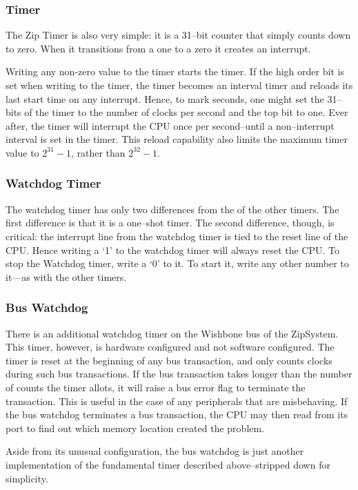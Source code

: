 \documentclass{gqtekspec}
\begin{document}
\subsubsection{Timer}

The Zip Timer is also very simple: it is a 31--bit counter that simply counts
down to zero.  When it transitions from a one to a zero it creates an interrupt.

Writing any non-zero value to the timer starts the timer.  If the high order
bit is set when writing to the timer, the timer becomes an interval timer and
reloads its last start time on any interrupt.  Hence, to mark seconds, one
might set the 31--bits of the timer to the number of clocks per second and the
top bit to one.  Ever after, the timer will interrupt the CPU once per
second--until a non--interrupt interval is set in the timer.  This reload
capability also limits the maximum timer value to $2^{31}-1$, rather than
$2^{32}-1$.

\subsubsection{Watchdog Timer}

The watchdog timer has only two differences from the of the other timers.
The first difference is that it is a one--shot timer.  The second difference,
though, is critical: the interrupt line from the watchdog timer is tied to the
reset line of the CPU.  Hence writing a `1' to the watchdog timer will always
reset the CPU.  To stop the Watchdog timer, write a `0' to it.  To start it,
write any other number to it---as with the other timers.


\subsubsection{Bus Watchdog}
There is an additional watchdog timer on the Wishbone bus of the ZipSystem. 
This timer,
however, is hardware configured and not software configured.  The timer is
reset at the beginning of any bus transaction, and only counts clocks during
such bus transactions.  If the bus transaction takes longer than the number
of counts the timer allots, it will raise a bus error flag to terminate the
transaction.  This is useful in the case of any peripherals that are
misbehaving.  If the bus watchdog terminates a bus transaction, the CPU may
then read from its port to find out which memory location created the problem.

Aside from its unusual configuration, the bus watchdog is just another
implementation of the fundamental timer described above--stripped down
for simplicity.
\end{document}
